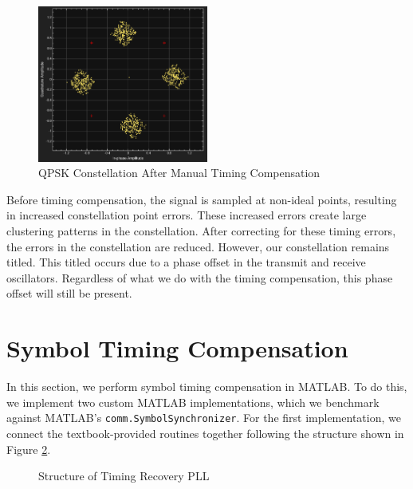\documentclass{article}
\begin{document}
\begin{figure}[H]
	\centerline{\includegraphics[width=0.5\textwidth]{pluto_constellation_best.png}}
	\caption{QPSK Constellation After Manual Timing Compensation}
	\label{fig::pluto_constellation_best}
\end{figure}

\noindent Before timing compensation, the signal is sampled at non-ideal points, resulting in increased constellation point errors. These increased errors create large clustering patterns in the constellation. After correcting for these timing errors, the errors in the constellation are reduced. However, our constellation remains titled. This titled occurs due to a phase offset in the transmit and receive oscillators. Regardless of what we do with the timing compensation, this phase offset will still be present.

\section{Symbol Timing Compensation}

In this section, we perform symbol timing compensation in MATLAB. To do this, we implement two custom MATLAB implementations, which we benchmark against MATLAB's \texttt{comm.SymbolSynchronizer}. For the first implementation, we connect the textbook-provided routines together following the structure shown in Figure \ref{fig::timing_recovery_block_diagram}.

\begin{figure}[H]
	\centerline{}
	\caption{Structure of Timing Recovery PLL}
	\label{fig::timing_recovery_block_diagram}
\end{figure}
\end{document}
